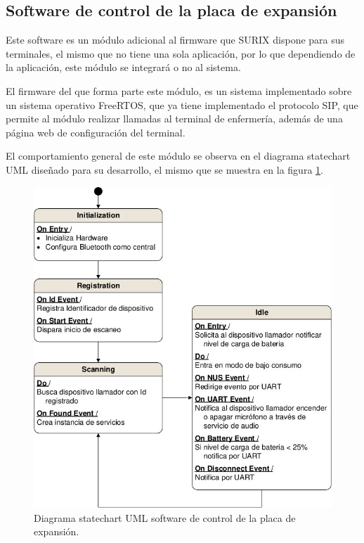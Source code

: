 \subsection{Software de control de la placa de expansión}
\label{subsec:SoftControl}

Este software es un módulo adicional al firmware que SURIX dispone para sus terminales, el mismo que no tiene una sola aplicación, por lo que dependiendo de la aplicación, este módulo se integrará o no al sistema.

El firmware del que forma parte este módulo, es un sistema implementado sobre un sistema operativo FreeRTOS, que ya tiene implementado el protocolo SIP, que permite al módulo realizar llamadas al terminal de enfermería, además de una página web de configuración del terminal.

El comportamiento general de este módulo se observa en el diagrama statechart UML diseñado para su desarrollo, el mismo que se muestra en la figura \ref{fig:DiagramaSoftControl}.

\begin{figure}[htpb]
	\centering
	\includegraphics[scale=0.8]{./Figures/Dcontrol.jpeg}
	\caption{Diagrama statechart UML software de control de la placa de expansión.}
	\label{fig:DiagramaSoftControl}
\end{figure}


